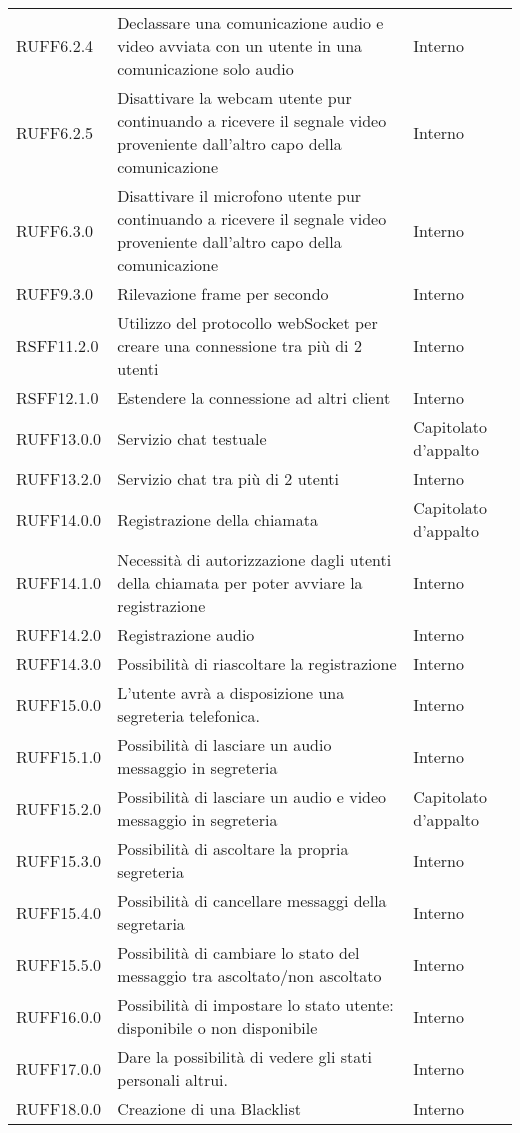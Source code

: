 \begin{center}
\begin{longtable}{lp{}l}
RUFF6.2.4 & Declassare una comunicazione audio e video avviata con un utente in una comunicazione solo audio & Interno \\
RUFF6.2.5 & Disattivare la webcam utente pur continuando a ricevere il segnale video proveniente dall'altro capo della comunicazione & Interno \\
RUFF6.3.0 & Disattivare il microfono utente pur continuando a ricevere il segnale video proveniente dall'altro capo della comunicazione & Interno \\
RUFF9.3.0 & Rilevazione frame per secondo & Interno \\
RSFF11.2.0 & Utilizzo del protocollo webSocket per creare una connessione tra più di 2 utenti & Interno \\
RSFF12.1.0 & Estendere la connessione ad altri client & Interno \\
RUFF13.0.0 & Servizio chat testuale & Capitolato d'appalto \\
RUFF13.2.0 & Servizio chat tra più di 2 utenti & Interno \\
RUFF14.0.0 & Registrazione della chiamata & Capitolato d'appalto \\
RUFF14.1.0 & Necessità di autorizzazione dagli utenti della chiamata per poter avviare la registrazione & Interno \\
RUFF14.2.0 & Registrazione audio & Interno \\
RUFF14.3.0 & Possibilità di riascoltare la registrazione & Interno \\
RUFF15.0.0 & L'utente avrà a disposizione una segreteria telefonica. & Interno \\
RUFF15.1.0 & Possibilità di lasciare un audio messaggio in segreteria & Interno \\
RUFF15.2.0 & Possibilità di lasciare un audio e video messaggio in segreteria & Capitolato d'appalto \\
RUFF15.3.0 & Possibilità di ascoltare la propria segreteria & Interno \\
RUFF15.4.0 & Possibilità di cancellare messaggi della segretaria & Interno \\
RUFF15.5.0 & Possibilità di cambiare lo stato del messaggio tra ascoltato/non ascoltato & Interno \\
RUFF16.0.0 & Possibilità di impostare lo stato utente: disponibile o non disponibile & Interno \\
RUFF17.0.0 & Dare la possibilità di vedere gli stati personali altrui. & Interno \\
RUFF18.0.0 & Creazione di una Blacklist & Interno \\

\end{longtable}
\end{center}
